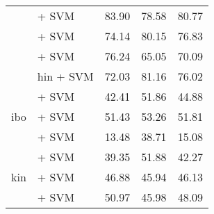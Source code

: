 \begin{table*}[ht]
\begin{tabular}{@{}llp{1.1cm}p{1.1cm}p{1.1cm}@{}}
                                           & \citep{wang2024multilingual} + SVM                                 & 83.90                           & 78.58                              & 80.77                             \\
                                           & \citep{joshi2022l3cubemahasbert} + SVM                             & 74.14                           & 80.15                              & 76.83                             \\
                                           & \citep{nogueira2019documentexpansionqueryprediction} + SVM         & 76.24                           & 65.05                              & 70.09                             \\
                                           & \citep{feng2020languageagnostic} hin + SVM                         & 72.03                           & 81.16                              & 76.02                             \\
        \midrule
        \multirow{3}{*}{ibo}               & \citep{feng2022languageagnosticbertsentenceembedding} + SVM        & 42.41                           & 51.86                              & 44.88                             \\
                                           & \citep{wang2024multilingual} + SVM                                 & 51.43                           & 53.26                              & 51.81                             \\
                                           & \citep{oketunji2024pmmlv2finetunedigbo} + SVM                      & 13.48                           & 38.71                              & 15.08                             \\
        \midrule
        \multirow{3}{*}{kin}               & \citep{feng2022languageagnosticbertsentenceembedding} + SVM        & 39.35                           & 51.88                              & 42.27                             \\
                                           & \citep{adelani2023bertmultilingualkinyarwanda} + SVM               & 46.88                           & 45.94                              & 46.13                             \\
                                           & \citep{wang2024multilingual} + SVM                                 & 50.97                           & 45.98                              & 48.09                             \\

\end{tabular}
\end{table*}
